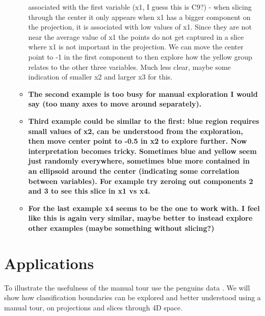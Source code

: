 \documentclass[]{interact}
\theoremstyle{plain}%
\theoremstyle{definition}
\theoremstyle{remark}
\begin{document}
\begin{itemize}
\begin{itemize}
{    associated with the first variable (x1, I guess this is C9?) - when
    slicing through the center it only appears when x1 has a bigger
    component on the projection, it is associated with low values of x1.
    Since they are not near the average value of x1 the points do not
    get captured in a slice where x1 is not important in the projection.
    We can move the center point to -1 in the first component to then
    explore how the yellow group relates to the other three variables.
    Much less clear, maybe some indication of smaller x2 and larger x3
    for this.}
  \item
    \textbf{The second example is too busy for manual exploration I
    would say (too many axes to move around separately).}
  \item
    \textbf{Third example could be similar to the first: blue region
    requires small values of x2, can be understood from the exploration,
    then move center point to -0.5 in x2 to explore further. Now
    interpretation becomes tricky. Sometimes blue and yellow seem just
    randomly everywhere, sometimes blue more contained in an ellipsoid
    around the center (indicating some correlation between variables).
    For example try zeroing out components 2 and 3 to see this slice in
    x1 vs x4.}
  \item
    \textbf{For the last example x4 seems to be the one to work with. I
    feel like this is again very similar, maybe better to instead
    explore other examples (maybe something without slicing?)}
  \end{itemize}
\end{itemize}

\hypertarget{sec:examples}{%
\section{Applications}\label{sec:examples}}

To illustrate the usefulness of the manual tour use the penguins data
\citep{penguins}. We will show how classification boundaries can be
explored and better understood using a manual tour, on projections and
slices through 4D space.
\end{document}
